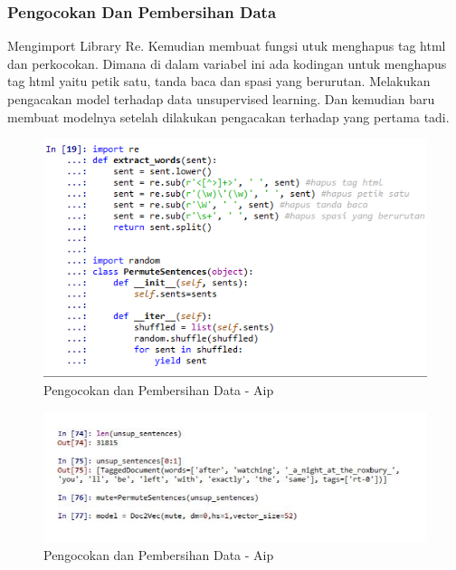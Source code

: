 \subsubsection{Pengocokan Dan Pembersihan Data}
Mengimport Library Re. Kemudian membuat fungsi utuk menghapus tag html dan perkocokan. Dimana di dalam variabel ini ada kodingan untuk menghapus tag html yaitu petik satu, tanda baca dan spasi yang berurutan. Melakukan pengacakan model terhadap data unsupervised learning. Dan kemudian baru membuat modelnya setelah dilakukan pengacakan terhadap yang pertama tadi.
\begin{figure}[ht]
\centering
\includegraphics[scale=0.3]{figures/AIP/e22.PNG}
\caption{Pengocokan dan Pembersihan Data - Aip}
\label{Pengocokan dan Pembersihan Data - Aip}
\end{figure}

\begin{figure}[ht]
\centering
\includegraphics[scale=0.3]{figures/AIP/e23.PNG}
\caption{Pengocokan dan Pembersihan Data - Aip}
\label{Pengocokan dan Pembersihan Data - Aip}
\end{figure}

